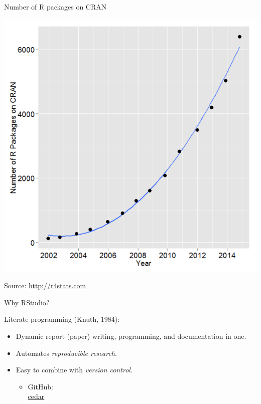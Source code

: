 \begin{frame}{Number of R packages on CRAN}

\includegraphics{figures/fig_9_cran.png}

Source: \url{http://r4stats.com}

\end{frame}

\begin{frame}{Why RStudio?}

Literate programming (Knuth, 1984):

\begin{itemize}
\item
  Dynamic report (paper) writing, programming, and documentation in one.
\item
  Automates \emph{reproducible research}.
\item
  Easy to combine with \emph{version control}.

  \begin{itemize}
  \itemsep1pt\parskip0pt
  \item
    GitHub:\\\href{http://github.com/goranbrostrom/cedar/}{cedar}
  \end{itemize}
\end{itemize}

\end{frame}

